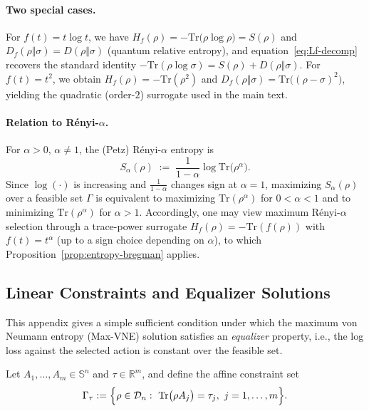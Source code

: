 \documentclass{article}
\theoremstyle{plain}
\theoremstyle{definition}
\def\eqref#1{equation~\ref{#1}}
\begin{document}
\begin{appendices}
\paragraph{Two special cases.}
For $f(t)=t\log t$, we have
$H_f(\rho)=-\mathrm{Tr}\bigl(\rho\log\rho\bigr)=S(\rho)$ and
$D_f(\rho\Vert\sigma)=D(\rho\Vert\sigma)$ (quantum relative entropy), and
\eqref{eq:Lf-decomp} recovers the standard identity
$-\mathrm{Tr}(\rho\log\sigma)=S(\rho)+D(\rho\Vert\sigma)$.
For $f(t)=t^2$, we obtain $H_f(\rho)=-\mathrm{Tr}(\rho^2)$ and
$D_f(\rho\Vert\sigma)=\mathrm{Tr}\bigl((\rho-\sigma)^2\bigr)$, yielding the quadratic
(order-$2$) surrogate used in the main text.

\paragraph{Relation to R\'enyi-$\alpha$.}
For $\alpha>0$, $\alpha\neq 1$, the (Petz) R\'enyi-$\alpha$ entropy is
\begin{equation}
S_\alpha(\rho)
\;:=\;
\frac{1}{1-\alpha}\log \mathrm{Tr}\bigl(\rho^\alpha\bigr).
\label{eq:renyi}
\end{equation}
Since $\log(\cdot)$ is increasing and $\frac{1}{1-\alpha}$ changes sign at $\alpha=1$,
maximizing $S_\alpha(\rho)$ over a feasible set $\Gamma$ is equivalent to maximizing
$\mathrm{Tr}(\rho^\alpha)$ for $0<\alpha<1$ and to minimizing $\mathrm{Tr}(\rho^\alpha)$
for $\alpha>1$. Accordingly, one may view maximum R\'enyi-$\alpha$ selection through
a trace-power surrogate $H_f(\rho)=-\mathrm{Tr}(f(\rho))$ with $f(t)=t^\alpha$ (up to
a sign choice depending on $\alpha$), to which Proposition~\ref{prop:entropy-bregman}
applies.

\subsection{Linear Constraints and Equalizer Solutions}
\label{app:linear-constraints}

This appendix gives a simple sufficient condition under which the maximum
von Neumann entropy (Max-VNE) solution satisfies an \emph{equalizer} property,
i.e., the log loss against the selected action is constant over the feasible set.

Let $A_1,\dots,A_m\in\mathbb{S}^n$ and $\tau\in\mathbb{R}^m$, and define the affine
constraint set
\[
\Gamma_{\tau}
:=
\Bigl\{\rho\in\mathcal{D}_n:\ \mathrm{Tr}\bigl(\rho A_j\bigr)=\tau_j,\ j=1,\dots,m\Bigr\}.
\]


\end{appendices}
\end{document}
